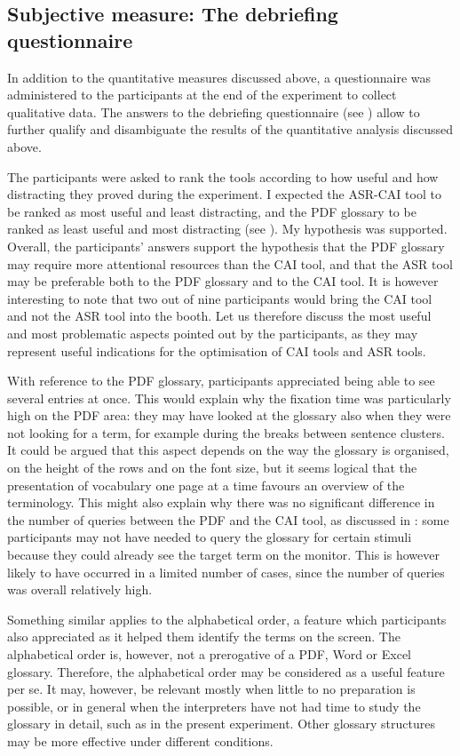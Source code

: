 \subsection{Subjective measure: The debriefing questionnaire} \label{questionnairedisc}
In addition to the quantitative measures discussed above, a questionnaire was administered to the participants at the end of the experiment to collect qualitative data. The answers to the debriefing questionnaire (see ) allow to further qualify and disambiguate the results of the quantitative analysis discussed above.

The participants were asked to rank the tools according to how useful and how distracting they proved during the experiment. I expected the ASR-CAI tool to be ranked as most useful and least distracting, and the PDF glossary to be ranked as least useful and most distracting (see ). My hypothesis was supported. Overall, the participants' answers support the hypothesis that the PDF glossary may require more attentional resources than the CAI tool, and that the ASR tool may be preferable both to the PDF glossary and to the CAI tool. It is however interesting to note that two out of nine participants would bring the CAI tool and not the ASR tool into the booth. Let us therefore discuss the most useful and most problematic aspects pointed out by the participants, as they may represent useful indications for the optimisation of CAI tools and ASR tools.

With reference to the PDF glossary, participants appreciated being able to see several entries at once. This would explain why the fixation time was particularly high on the PDF area: they may have looked at the glossary also when they were not looking for a term, for example during the breaks between sentence clusters. It could be argued that this aspect depends on the way the glossary is organised, on the height of the rows and on the font size, but it seems logical that the presentation of vocabulary one page at a time favours an overview of the terminology. This might also explain why there was no significant difference in the number of queries between the PDF and the CAI tool, as discussed in : some participants may not have needed to query the glossary for certain stimuli because they could already see the target term on the monitor. This is however likely to have occurred in a limited number of cases, since the number of queries was overall relatively high.

Something similar applies to the alphabetical order, a feature which participants also appreciated as it helped them identify the terms on the screen. The alphabetical order is, however, not a prerogative of a PDF, Word or Excel glossary. Therefore, the alphabetical order may be considered as a useful feature per se. It may, however, be relevant mostly when little to no preparation is possible, or in general when the interpreters have not had time to study the glossary in detail, such as in the present experiment. Other glossary structures may be more effective under different conditions.

